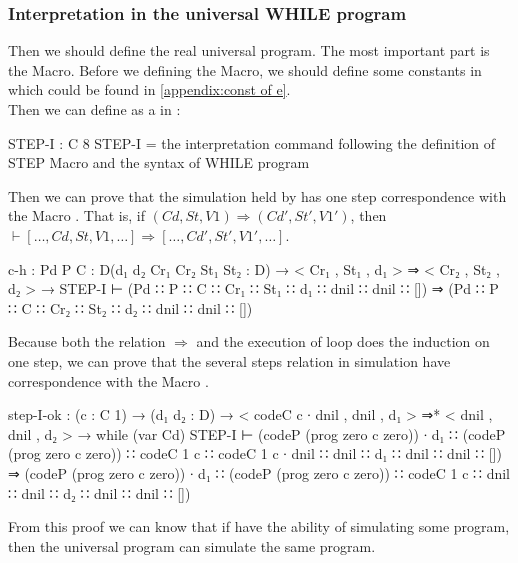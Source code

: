 \subsubsection{Interpretation in the universal WHILE program}\label{definition: while simulation}
Then we should define the real universal \WHILE program.
The most important part is the  Macro.
Before we defining the Macro, we should define some constants in  which could be found in \ref{appendix:const of e}.\\
Then we can define  as a  in \Agda:
\begin{code}
STEP-I : C 8
STEP-I =  the interpretation command
	  following the definition of STEP Macro
	  and the syntax of WHILE program
\end{code}
Then we can prove that the simulation held by \Agda has one step correspondence with the Macro .
That is, if $(Cd,St,V1)\Rightarrow(Cd',St',V1')$, then  $\vdash [\dots, Cd, St, V1, \dots] \Rightarrow [\dots, Cd', St', V1', \dots]$.
\begin{code}
  c-h : {Pd P C : D}(d₁ d₂ Cr₁ Cr₂ St₁ St₂ : D) 
        → < Cr₁ , St₁ , d₁ > ⇒ < Cr₂ , St₂ , d₂ >
        → STEP-I ⊢ (Pd ∷ P ∷ C ∷ Cr₁ ∷ St₁ ∷ d₁ ∷ dnil ∷ dnil ∷ [])
                 ⇒ (Pd ∷ P ∷ C ∷ Cr₂ ∷ St₂ ∷ d₂ ∷ dnil ∷ dnil ∷ [])
\end{code}
Because both the relation $\Rightarrow$ and the execution of  loop does the induction on one step, we can prove that the several steps relation in \Agda simulation have correspondence with the Macro .
\begin{code}[fontsize=\footnotesize]
step-I-ok : (c : C 1) → (d₁ d₂ : D) 
            → < codeC c ∙ dnil , dnil , d₁ > ⇒* < dnil , dnil , d₂ >
            → while (var Cd) STEP-I ⊢ (codeP (prog zero c zero)) ∙ d₁ ∷
                                      (codeP (prog zero c zero)) ∷
                                      codeC {1} c ∷ codeC {1} c ∙ dnil  ∷
                                      dnil ∷ d₁ ∷ dnil ∷ dnil ∷ [])
                                    ⇒ (codeP (prog zero c zero)) ∙ d₁ ∷
                                      (codeP (prog zero c zero)) ∷
                                      codeC {1} c ∷ dnil ∷ dnil ∷
                                      d₂ ∷ dnil ∷ dnil ∷ [])
\end{code}
From this proof we can know that if \Agda have the ability of simulating some \WHILE program, then the universal \WHILE program can simulate the same \WHILE program.
